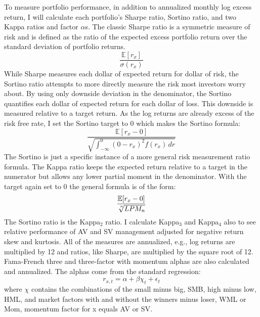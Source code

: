To measure portfolio performance, in addition to annualized monthly log excess return, I will calculate each portfolio's Sharpe ratio, Sortino ratio, and two Kappa ratios and factor $\alpha$s. The classic Sharpe ratio is a symmetric measure of risk and is defined as the ratio of the expected excess portfolio return over the standard deviation of portfolio returns.
\begin{equation}
	\frac{\mathbb{E}[r_{x}]}{\sigma(r_{x})}
\end{equation}
While Sharpe measures each dollar of expected return for dollar of risk, the Sortino ratio attempts to more directly measure the risk most investors worry about. By using only downside deviation in the denominator, the Sortino quantifies each dollar of expected return for each dollar of loss. This downside is measured relative to a target return. \citep{sortino_performance_1994} As the log returns are already excess of the risk free rate, I set the Sortino target to 0 which makes the Sortino formula:
\begin{equation}
	\frac{\mathbb{E}[r_{x} - 0]}{\sqrt  {\int _{{-\infty }}^{0}(0-r_{x})^{2}f(r_{x})\,dr}}
\end{equation}
The Sortino is just a specific instance of a more general risk measurement ratio formula. The Kappa ratio keeps the expected return relative to a target in the numerator but allows any lower partial moment in the denominator. \citep{kaplan_kappa:_2004} With the target again set to 0 the general formula is of the form:
\begin{equation}
\frac{\mathbb{E}[r_{x} - 0]}{\sqrt[\leftroot{-2}\uproot{2}n]{LPM_{n}}} 
\end{equation}
The Sortino ratio is the Kappa$_{2}$ ratio. I calculate Kappa$_{3}$ and Kappa$_{4}$ also to see relative performance of AV and SV management adjusted for negative return skew and kurtosis. All of the measures are annualized, e.g., log returns are multiplied by 12 and ratios, like Sharpe, are multiplied by the square root of 12. Fama-French three and three-factor with momentum alphas are also calculated and annualized. The alphas come from the standard regression:
\begin{equation}
	r_{x,t} = \alpha + \beta\chi_{t} + \epsilon_{t}
\end{equation}
where $\chi$ contains the combinations of the small minus big, SMB, high minus low, HML, and market factors with and without the winners minus loser, WML or Mom, momentum factor for x equals AV or SV.

